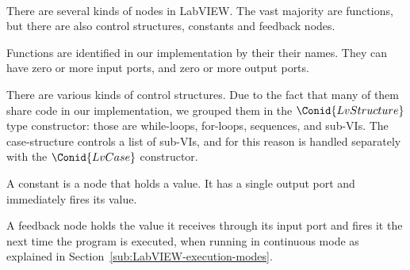 \begin{hscode}\SaveRestoreHook
{}%
%
%
%
%
%
%
%
%
\>[B]{}\;\<[19]%
\>[19]{}\mathrel{=}{}\<[19E]%
\>[22]{}\;\<[E]%
\\
\>[19]{}\mid {}\<[19E]%
\>[22]{}\;\<[E]%
\\
\>[19]{}\mid {}\<[19E]%
\>[22]{}\;\<[E]%
\\
\>[B]{}\<[4]%
\>[4]{}\;\<[E]%
\\[\blanklineskip]%
\>[B]{}\;\<[20]%
\>[20]{}\mathrel{=}{}\<[20E]%
\>[23]{}\<[E]%
\\
\>[20]{}\mid {}\<[20E]%
\>[23]{}\<[E]%
\\
\>[B]{}\<[4]%
\>[4]{}\;\<[E]%
\ColumnHook
\end{hscode}\resethooks

There are several kinds of nodes in LabVIEW. The vast majority are functions,
but there are also control structures, constants and feedback nodes.

Functions are identified in our implementation by their their names. They can
have zero or more input ports, and zero or more output ports.

There are various kinds of control structures. Due to the fact that many of
them share code in our implementation, we grouped them in the \ensuremath{\Conid{LvStructure}}
type constructor: those are while-loops, for-loops, sequences, and sub-VIs.
The case-structure controls a list of sub-VIs, and for this reason is handled
separately with the \ensuremath{\Conid{LvCase}} constructor.

A constant is a node that holds a value. It has a single output port and
immediately fires its value.

A feedback node holds the value it receives through its input port and fires
it the next time the program is executed, when running in continuous mode
as explained in Section~\ref{sub:LabVIEW-execution-modes}.

